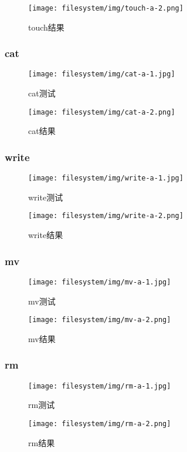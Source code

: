 \begin{figure}[H]
  \centering
  \texttt{[image: filesystem/img/touch-a-2.png]}
  \caption{touch结果}
\end{figure}

\subsubsection{cat}

\begin{figure}[H]
  \centering
  \texttt{[image: filesystem/img/cat-a-1.jpg]}
  \caption{cat测试}
\end{figure}

\begin{figure}[H]
  \centering
  \texttt{[image: filesystem/img/cat-a-2.png]}
  \caption{cat结果}
\end{figure}


\subsubsection{write}

\begin{figure}[H]
  \centering
  \texttt{[image: filesystem/img/write-a-1.jpg]}
  \caption{write测试}
\end{figure}

\begin{figure}[H]
  \centering
  \texttt{[image: filesystem/img/write-a-2.png]}
  \caption{write结果}
\end{figure}


\subsubsection{mv}

\begin{figure}[H]
  \centering
  \texttt{[image: filesystem/img/mv-a-1.jpg]}
  \caption{mv测试}
\end{figure}

\begin{figure}[H]
  \centering
  \texttt{[image: filesystem/img/mv-a-2.png]}
  \caption{mv结果}
\end{figure}

\subsubsection{rm}

\begin{figure}[H]
  \centering
  \texttt{[image: filesystem/img/rm-a-1.jpg]}
  \caption{rm测试}
\end{figure}

\begin{figure}[H]
  \centering
  \texttt{[image: filesystem/img/rm-a-2.png]}
  \caption{rm结果}
\end{figure}

